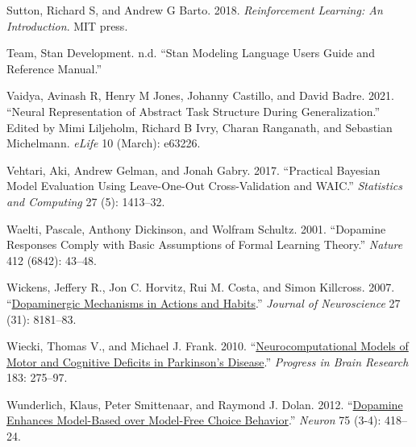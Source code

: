\documentclass{article}
\newlength{\cslhangindent}
\newlength{\cslentryspacingunit} %
\newenvironment{CSLReferences}[2] %
 {%
  \setlength{\parindent}{0pt}
  \ifodd #1
  \let\oldpar\par
  \def\par{\hangindent=\cslhangindent\oldpar}
  \fi
  \setlength{\parskip}{#2\cslentryspacingunit}
 }%
 {}
\begin{document}
\begin{CSLReferences}{1}{0}
\leavevmode{}%
Sutton, Richard S, and Andrew G Barto. 2018. \emph{Reinforcement
Learning: {An} Introduction}. {MIT press}.

\leavevmode{}%
Team, Stan Development. n.d. {``Stan {Modeling Language Users Guide} and
{Reference Manual}.''}

\leavevmode{}%
Vaidya, Avinash R, Henry M Jones, Johanny Castillo, and David Badre.
2021. {``Neural Representation of Abstract Task Structure During
Generalization.''} Edited by Mimi Liljeholm, Richard B Ivry, Charan
Ranganath, and Sebastian Michelmann. \emph{eLife} 10 (March): e63226.

\leavevmode{}%
Vehtari, Aki, Andrew Gelman, and Jonah Gabry. 2017. {``Practical
{Bayesian} Model Evaluation Using Leave-One-Out Cross-Validation and
{WAIC}.''} \emph{Statistics and Computing} 27 (5): 1413--32.

\leavevmode{}%
Waelti, Pascale, Anthony Dickinson, and Wolfram Schultz. 2001.
{``Dopamine Responses Comply with Basic Assumptions of Formal Learning
Theory.''} \emph{Nature} 412 (6842): 43--48.

\leavevmode{}%
Wickens, Jeffery R., Jon C. Horvitz, Rui M. Costa, and Simon Killcross.
2007.
{``\href{https://www.ncbi.nlm.nih.gov/pubmed/17670964}{Dopaminergic
{Mechanisms} in {Actions} and {Habits}}.''} \emph{Journal of
Neuroscience} 27 (31): 8181--83.

\leavevmode{}%
Wiecki, Thomas V., and Michael J. Frank. 2010.
{``\href{https://www.ncbi.nlm.nih.gov/pubmed/20696325}{Neurocomputational
Models of Motor and Cognitive Deficits in {Parkinson}'s Disease}.''}
\emph{Progress in Brain Research} 183: 275--97.

\leavevmode{}%
Wunderlich, Klaus, Peter Smittenaar, and Raymond J. Dolan. 2012.
{``\href{https://www.ncbi.nlm.nih.gov/pmc/articles/PMC3417237}{Dopamine
{Enhances Model-Based} over {Model-Free Choice Behavior}}.''}
\emph{Neuron} 75 (3-4): 418--24.

\end{CSLReferences}



\end{document}
